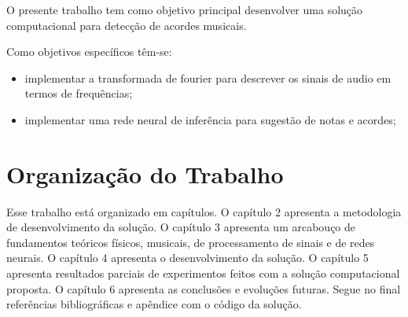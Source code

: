O presente trabalho tem como objetivo principal desenvolver uma solução computacional para detecção de acordes musicais.

Como objetivos específicos têm-se:

 	\begin{itemize}
        \item implementar a transformada de fourier para descrever os sinais de audio em termos de frequências;
        \item implementar uma rede neural de inferência para sugestão de notas e acordes;
    \end{itemize}

\section{Organização do Trabalho}
\label{sec:organizacao}

Esse trabalho está organizado em capítulos. O capítulo 2 apresenta a metodologia de desenvolvimento da solução. O capítulo 3 apresenta um arcabouço de fundamentos teóricos físicos, musicais, de processamento de sinais e de redes neurais. O capítulo 4 apresenta o desenvolvimento da solução. O capítulo 5 apresenta resultados parciais de experimentos feitos com a solução computacional proposta. O capítulo 6 apresenta as conclusões e evoluções futuras. Segue no final referências bibliográficas e apêndice com o código da solução. 
